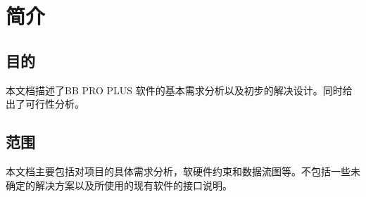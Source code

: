\chapter{简介}
\section{目的}
本文档描述了BB PRO PLUS 软件的基本需求分析以及初步的解决设计。同时给出了可行性分析。

\section{范围}
本文档主要包括对项目的具体需求分析，软硬件约束和数据流图等。不包括一些未确定的解决方案以及所使用的现有软件的接口说明。
